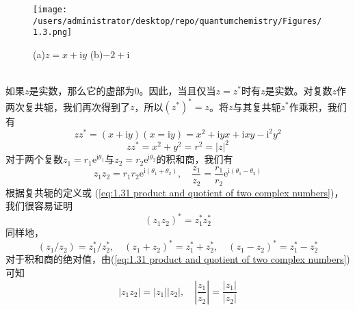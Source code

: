 		\begin{figure}[h!]
		\centering
		\texttt{[image: /users/administrator/desktop/repo/quantumchemistry/Figures/1.3.png]}  %
		\caption{(a)$z = x + \mathrm{i}y$  (b)$-2+\mathrm{i}$}
		\label{fig:1.3}
	\end{figure}\\
	\indent 如果$z$是实数，那么它的虚部为0。因此，当且仅当$z = z^{\ast}$时有$z$是实数。对复数$z$作两次复共轭，我们再次得到了$z$，所以$\left(z^{\ast}\right)^{\ast}=z$。将$z$与其复共轭$z^{\ast}$作乘积，我们有
	\begin{equation*}
		zz^{\ast} = \left(x + \mathrm{i}y\right)\left(x= \mathrm{i}y\right) = x^2+\mathrm{i}yx+\mathrm{i}xy-\mathrm{i}^2y^2
	\end{equation*}
	\begin{equation}
		\boxed{zz^{\ast} = x^2+y^2=r^2=\left|z\right|^2}
		\label{eq:1.30 product of z and its complex conjugate}
	\end{equation}
	对于两个复数$z_1=r_1\mathrm{e}^{\mathrm{i}\theta_1}$与$z_2 = r_2\mathrm{e}^{\mathrm{i}\theta_2}$的积和商，我们有
	\begin{equation}
		z_1z_2 = r_1r_2\mathrm{e}^{\mathrm{i}\left(\theta_1+\theta_2\right)}, \quad \frac{z_1}{z_2} = \frac{r_1}{r_2}\mathrm{e}^{\mathrm{i} \left(\theta_1 - \theta_2\right)}
		\label{eq:1.31 product and quotient of two complex numbers}
	\end{equation}
	\indent 根据复共轭的定义或 (\ref{eq:1.31 product and quotient of two complex numbers})，我们很容易证明
	\begin{equation}
		\boxed{\left(z_1z_2\right)^{\ast} = z_1^{\ast} z_2^{\ast}}
		\label{eq:1.32 properties of complex conjugate}
	\end{equation}
	同样地，
	\begin{equation}
		\boxed{
				\left(z_1/z_2\right) = z_1^{\ast} / z_2^{\ast}, \quad \left(z_1+z_2\right)^{\ast} = z_1^{\ast} + z_2^{\ast} , \quad \left(z_1-z_2\right)^{\ast} = z_1^{\ast} - z_2^{\ast}}
		\label{eq:1.33 linear properties of complex conjugate
		}
	\end{equation}
	对于积和商的绝对值，由(\ref{eq:1.31 product and quotient of two complex numbers})可知
	\begin{equation}
		\left|z_1z_2\right|=\left|z_1\right|\left|z_2\right|, \quad \left|\frac{z_1}{z_2}\right| = \frac{\left|z_1\right|}{\left|z_2\right|}
		\label{eq:1.34 properties of product and quotient absolute values}
	\end{equation}
